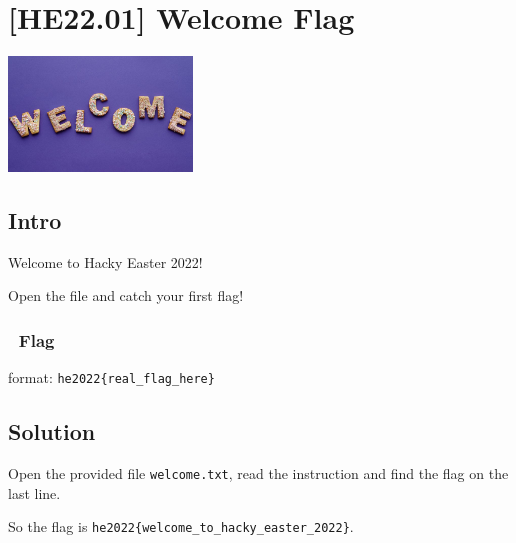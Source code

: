 
\hypertarget{he22.01}{%
\chapter{[HE22.01] Welcome Flag}\label{hv21.01}}

\begin{marginfigure}
	\includegraphics[width=49mm]{level1/challenge1.jpg}
\end{marginfigure}
\section{Intro}

Welcome to Hacky Easter 2022!

Open the file and catch your first flag!

\subsection{{\NotoEmoji 🚩} Flag}
\noindent format: \verb+he2022{real_flag_here}+

\section{Solution}\label{he22.01-solution}

Open the provided file \verb+welcome.txt+, read the instruction and find the
flag on the last line.

So the flag is \verb+he2022{welcome_to_hacky_easter_2022}+.

